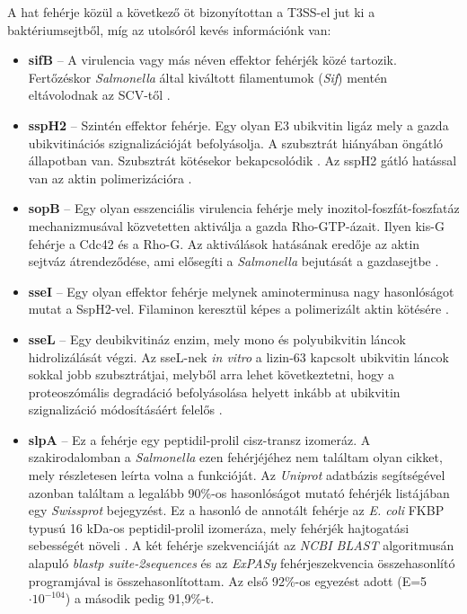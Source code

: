 \documentclass[a4paper,12pt]{article}
\begin{document}
		\noindent A hat fehérje közül a következő öt bizonyítottan a T3SS-el jut ki a baktériumsejtből, míg az utolsóról kevés információnk van:

		\begin{itemize}
			\item \textbf{sifB} -- A virulencia vagy más néven effektor fehérjék közé tartozik. Fertőzéskor \textit{Salmonella} által kiváltott filamentumok (\textit{Sif}) mentén eltávolodnak az SCV-től \cite{sifB}.
			\textit{}
			\item \textbf{sspH2} -- Szintén effektor fehérje. Egy olyan E3 ubikvitin ligáz mely a gazda ubikvitinációs szignalizációját befolyásolja. A szubsztrát hiányában öngátló állapotban van. Szubsztrát kötésekor bekapcsolódik \cite{ssph2}.  Az sspH2 gátló hatással van az aktin polimerizációra \cite{salmonella_and_host_cell_nature}.

			\item \textbf{sopB} -- Egy olyan esszenciális virulencia fehérje mely inozitol-foszfát-foszfatáz mechanizmusával közvetetten aktiválja a gazda Rho-GTP-ázait. Ilyen kis-G fehérje a Cdc42 és a Rho-G. Az aktiválások hatásának eredője az aktin sejtváz átrendeződése, ami elősegíti a \textit{Salmonella} bejutását a gazdasejtbe \cite{salmonella_and_host_cell_nature}.

			\item \textbf{sseI} -- Egy olyan effektor fehérje melynek aminoterminusa nagy hasonlóságot mutat a SspH2-vel. Filaminon keresztül képes a polimerizált aktin kötésére \cite{salmonella_and_host_cell_nature}.

			\item \textbf{sseL} -- Egy deubikvitináz enzim, mely  mono és polyubikvitin láncok hidrolizálását végzi. Az sseL-nek \textit{in vitro} a lizin-63 kapcsolt ubikvitin láncok sokkal jobb szubsztrátjai, melyből arra lehet következtetni, hogy a proteoszómális degradáció befolyásolása helyett inkább at ubikvitin szignalizáció módosításáért felelős \cite{sseL}.

			\item \textbf{slpA} -- Ez a fehérje egy peptidil-prolil cisz-transz izomeráz. A szakirodalomban a \textit{Salmonella} ezen fehérjéjéhez nem találtam olyan cikket, mely részletesen leírta volna a funkcióját. Az \textit{Uniprot} adatbázis segítségével azonban találtam a legalább 90\%-os hasonlóságot mutató fehérjék listájában egy \textit{Swissprot} bejegyzést. Ez a hasonló de annotált fehérje az \textit{E. coli} FKBP typusú 16 kDa-os peptidil-prolil izomeráza, mely fehérjék hajtogatási sebességét növeli \cite{fkbp}.  A két fehérje szekvenciáját az \textit{NCBI BLAST} algoritmusán alapuló \textit{blastp suite-2sequences} és az \textit{ExPASy} fehérjeszekvencia összehasonlító programjával is összehasonlítottam. Az első 92\%-os egyezést adott (E=5$\cdot 10^{-104}$) a második pedig 91,9\%-t.

		\end{itemize}
\end{document}
